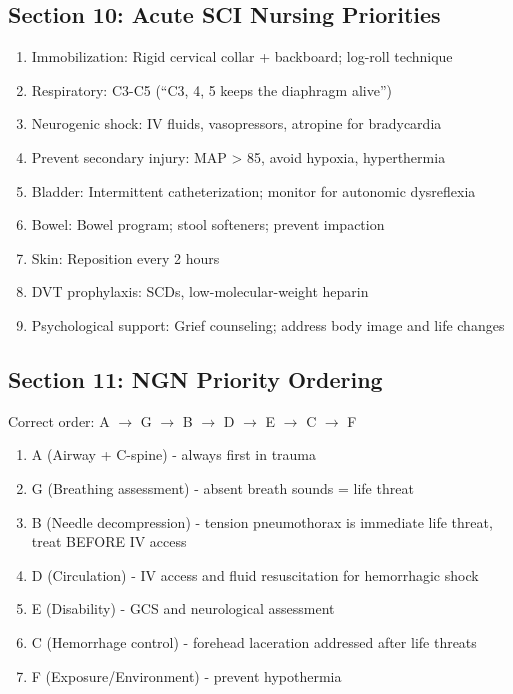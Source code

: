 \documentclass[11pt]{article}
\begin{document}
\subsection*{Section 10: Acute SCI Nursing Priorities}
\begin{enumerate}
    \item Immobilization: Rigid cervical collar + backboard; log-roll technique
    \item Respiratory: C3-C5 (``C3, 4, 5 keeps the diaphragm alive'')
    \item Neurogenic shock: IV fluids, vasopressors, atropine for bradycardia
    \item Prevent secondary injury: MAP > 85, avoid hypoxia, hyperthermia
    \item Bladder: Intermittent catheterization; monitor for autonomic dysreflexia
    \item Bowel: Bowel program; stool softeners; prevent impaction
    \item Skin: Reposition every 2 hours
    \item DVT prophylaxis: SCDs, low-molecular-weight heparin
    \item Psychological support: Grief counseling; address body image and life changes
\end{enumerate}

\subsection*{Section 11: NGN Priority Ordering}
Correct order: A $\rightarrow$ G $\rightarrow$ B $\rightarrow$ D $\rightarrow$ E $\rightarrow$ C $\rightarrow$ F

\begin{enumerate}
    \item A (Airway + C-spine) - always first in trauma
    \item G (Breathing assessment) - absent breath sounds = life threat
    \item B (Needle decompression) - tension pneumothorax is immediate life threat, treat BEFORE IV access
    \item D (Circulation) - IV access and fluid resuscitation for hemorrhagic shock
    \item E (Disability) - GCS and neurological assessment
    \item C (Hemorrhage control) - forehead laceration addressed after life threats
    \item F (Exposure/Environment) - prevent hypothermia
\end{enumerate}
\end{document}

